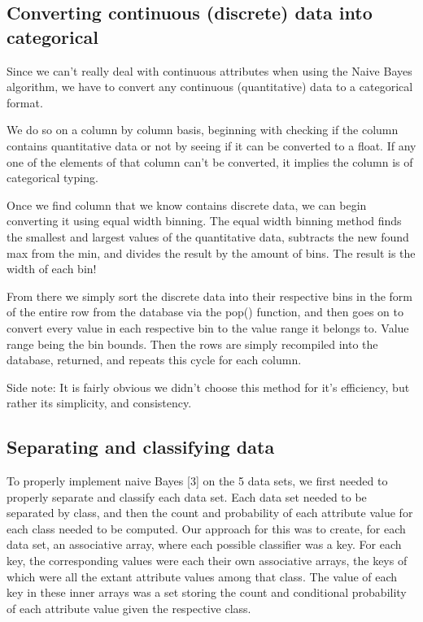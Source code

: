 \documentclass[twoside,11pt]{article}
\begin{document}
\subsection{Converting continuous (discrete) data into categorical}

Since we can’t really deal with continuous attributes when using the Naive Bayes algorithm, we have to convert any continuous (quantitative) data to a categorical format. 

We do so on a column by column basis, beginning with checking if the column contains quantitative data or not by seeing if it can be converted to a float. If any one of the elements of that column can’t be converted, it implies the column is of categorical typing. 

Once we find  column that we know contains discrete data, we can begin converting it using equal width binning. The equal width binning method finds the smallest and largest values of the quantitative data, subtracts the new found max from the min, and divides the result by the amount of bins. The result is the width of each bin!

From there we simply sort the discrete data into their respective bins in the form of the entire row from the database via the pop() function, and then goes on to convert every value in each respective bin to the value range it belongs to. Value range being the bin bounds. Then the rows are simply recompiled into the database, returned, and repeats this cycle for each column.

Side note: It is fairly obvious we didn't choose this method for it’s efficiency, but rather its simplicity, and consistency.


\subsection{Separating and classifying data}
To properly implement naive Bayes [3] on the 5 data sets, we first needed to properly separate and classify each data set. Each data set needed to be separated by class, and then the count and probability of each attribute value for each class needed to be computed. Our approach for this was to create, for each data set, an associative array, where each possible classifier was a key. For each key, the corresponding values were each their own associative arrays, the keys of which were all the extant attribute values among that class. The value of each key in these inner arrays was a set storing the count and conditional probability of each attribute value given the respective class. \\ \\
\end{document}

